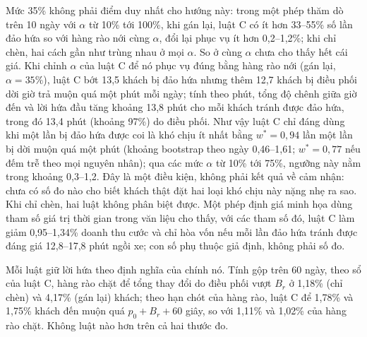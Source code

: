 Mức 35\% không phải điểm duy nhất cho hướng này: trong một phép thăm dò trên 10 ngày với $\alpha$ từ 10\% tới 100\%, khi gán
lại, luật C có ít hơn 33--55\% số lần đảo hứa so với hàng rào nới cùng $\alpha$, đổi lại phục vụ ít hơn 0,2--1,2\%; khi chỉ
chèn, hai cách gần như trùng nhau ở mọi $\alpha$. So ở cùng $\alpha$ chưa cho thấy hết cái giá. Khi chỉnh $\alpha$ của luật C
để nó phục vụ đúng bằng hàng rào nới (gán lại, $\alpha = 35\%$), luật C bớt 13,5 khách bị đảo hứa nhưng thêm 12,7 khách bị
điều phối dời giờ trả muộn quá một phút mỗi ngày; tính theo phút, tổng độ chênh giữa giờ đến và lời hứa đầu tăng khoảng 13,8
phút cho mỗi khách tránh được đảo hứa, trong đó 13,4 phút (khoảng 97\%) do điều phối. Như vậy luật C chỉ đáng dùng khi một lần bị đảo
hứa được coi là khó chịu ít nhất bằng $w^* = 0{,}94$ lần một lần bị dời muộn quá một phút (khoảng bootstrap theo ngày
0,46--1,61; $w^* = 0{,}77$ nếu đếm trễ theo mọi nguyên nhân); qua các mức $\alpha$ từ 10\% tới 75\%, ngưỡng này nằm trong
khoảng 0,3--1,2. Đây là một điều kiện, không phải kết quả về cảm nhận: chưa có số đo nào cho biết khách thật đặt hai loại
khó chịu này nặng nhẹ ra sao. Khi chỉ chèn, hai luật không phân biệt được. Một phép định giá minh họa dùng tham số giá trị
thời gian trong văn liệu cho thấy, với các tham số đó, luật C làm giảm 0,95--1,34\% doanh thu cước và chỉ hòa vốn nếu mỗi lần
đảo hứa tránh được đáng giá 12,8--17,8 phút ngồi xe; con số phụ thuộc giả định, không phải số đo.

Mỗi luật giữ lời hứa theo định nghĩa của chính nó. Tính gộp trên 60 ngày, theo sổ của luật C, hàng rào chặt để tổng thay
đổi do điều phối vượt $B_r$ ở 1,18\% (chỉ chèn) và 4,17\% (gán lại) khách; theo hạn chót của hàng rào, luật C để 1,78\% và
1,75\% khách đến muộn quá $p_0 + B_r + 60$ giây, so với 1,11\% và 1,02\% của hàng rào chặt. Không luật nào hơn trên cả hai
thước đo.

